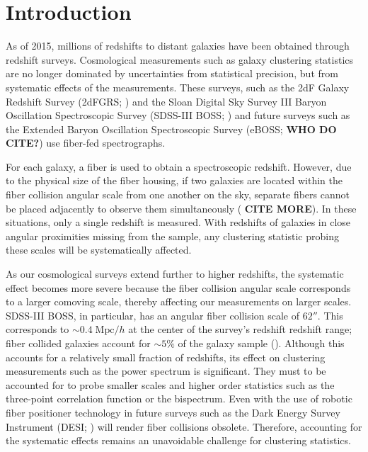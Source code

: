 \documentclass{emulateapj}
\begin{document}
\section{Introduction} 
As of 2015, millions of redshifts to distant galaxies have been obtained through redshift surveys. Cosmological measurements such as galaxy clustering statistics are no longer dominated by uncertainties from statistical precision, but from systematic effects of the measurements. These surveys, such as the 2dF Galaxy Redshift Survey (2dFGRS; \citealt{Colless:1999aa}) and the Sloan Digital Sky Survey III Baryon Oscillation Spectroscopic Survey (SDSS-III BOSS; \citealt{Anderson:2012aa, Dawson:2013aa}) and future surveys such as the Extended Baryon Oscillation Spectroscopic Survey (eBOSS; {\bf WHO DO CITE?}) use fiber-fed spectrographs. 

For each galaxy, a fiber is used to obtain a spectroscopic redshift. However, due to the physical size of the fiber housing, if two galaxies are located within the fiber collision angular scale from one another on the sky, separate fibers cannot be placed adjacently to observe them simultaneously (\citealt{Yoon:2008aa} {\bf CITE MORE}). In these situations, only a single redshift is measured. With redshifts of galaxies in close angular proximities missing from the sample, any clustering statistic probing these scales will be systematically affected. 

As our cosmological surveys extend further to higher redshifts, the systematic effect becomes more severe because the fiber collision angular scale corresponds to a larger comoving scale, thereby affecting our measurements on larger scales. SDSS-III BOSS, in particular, has an angular fiber collision scale of $62''$. This corresponds to $\sim 0.4 \;\mathrm{Mpc}/h$ at the center of the survey's redshift redshift range; fiber collided galaxies account for $\sim 5\%$ of the galaxy sample (\citealt{Anderson:2012aa}). Although this accounts for a relatively small fraction of redshifts, its effect on clustering measurements such as the power spectrum is significant. They must to be accounted for to probe smaller scales and higher order statistics such as the three-point correlation function or the bispectrum. Even with the use of robotic fiber positioner technology in future surveys such as the Dark Energy Survey Instrument (DESI; \citealt{Schlegel:2011aa, Morales:2012aa, Makarem:2014aa}) 
will render fiber collisions obsolete. Therefore, accounting for the systematic effects remains an unavoidable challenge for clustering statistics. 
\end{document}
